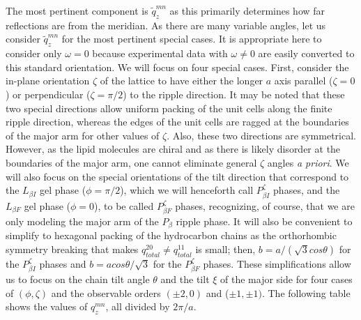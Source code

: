 The most pertinent component is $\tilde{q}_z^{mn}$ as this primarily determines 
how far reflections are from the meridian.  As there are many variable angles, 
let us consider $\tilde{q}_z^{mn}$ for the most pertinent special cases.  It is 
appropriate here to consider only $\omega=0$ because experimental data with 
$\omega{\neq}0$ are easily converted to this standard orientation.  We will 
focus on four special cases.  First, consider the in-plane orientation ${\zeta}$ 
of the lattice to have either the longer $a$ axis parallel (${\zeta}=0$) or 
perpendicular (${\zeta}={\pi}/2$) to the ripple direction.  It may be noted 
that these two special directions allow uniform packing of the unit cells along 
the finite ripple direction, whereas the edges of the unit cells are ragged at 
the boundaries of the major arm for other values of ${\zeta}$.  Also, these two 
directions are symmetrical.  However, as the lipid molecules are chiral and as 
there is likely disorder at the boundaries of the major arm, one cannot 
eliminate general ${\zeta}$ angles {\it a priori}.  We will also focus on the 
special orientations of the tilt direction that correspond to the $L_{{\beta}I}$ 
gel phase ($\phi=\pi/2$), which we will henceforth call $P_{{\beta}I}^{\zeta}$ 
phases, and the $L_{{\beta}F}$ gel phase ($\phi=0$), to be called 
$P_{{\beta}F}^{\zeta}$ phases, recognizing, of course, that we are only modeling 
the major arm of the $P_{\beta}$ ripple phase.   It will also be convenient to 
simplify to hexagonal packing of the hydrocarbon chains as the orthorhombic 
symmetry breaking that makes $q_{total}^{20}{\neq}q_{total}^{11}$ is small; 
then, $b=a/(\sqrt{3}cos{\theta})$ for the $P_{{\beta}I}^{\zeta}$ phases and 
$b=acos{\theta}/\sqrt{3}$ for the $P_{{\beta}F}^{\zeta}$ phases.  These 
simplifications allow us to focus on the chain tilt angle $\theta$ and the 
tilt $\xi$ of the major side for four cases of $(\phi,\zeta)$ and the 
observable orders $({\pm}2,0)$ and (${\pm}1,{\pm}1)$.  The following table 
shows the values of $q_z^{mn}$, all divided by $2\pi/a$.  

